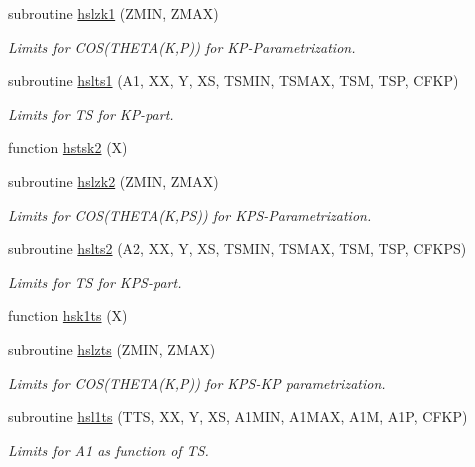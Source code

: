 \begin{DoxyCompactItemize}
subroutine \hyperlink{djangoh__h_8f_aa2758c7c67c101829423ac8239b00e62}{hslzk1} (Z\+M\+IN, Z\+M\+AX)
\begin{DoxyCompactList}\small\item\em Limits for C\+O\+S(\+T\+H\+E\+T\+A(\+K,\+P)) for K\+P-\/\+Parametrization. \end{DoxyCompactList}\item 
subroutine \hyperlink{djangoh__h_8f_ae4db38c1fc3b0a5dc77baf9d22e21aee}{hslts1} (A1, XX, Y, XS, T\+S\+M\+IN, T\+S\+M\+AX, T\+SM, T\+SP, C\+F\+KP)
\begin{DoxyCompactList}\small\item\em Limits for TS for K\+P-\/part. \end{DoxyCompactList}\item 
function \hyperlink{djangoh__h_8f_adc1cb09f2687cf5b9932be168cea4fb2}{hstsk2} (X)
\item 
subroutine \hyperlink{djangoh__h_8f_ac76dab3307c7242c03f4c84e184655b4}{hslzk2} (Z\+M\+IN, Z\+M\+AX)
\begin{DoxyCompactList}\small\item\em Limits for C\+O\+S(\+T\+H\+E\+T\+A(\+K,\+P\+S)) for K\+P\+S-\/\+Parametrization. \end{DoxyCompactList}\item 
subroutine \hyperlink{djangoh__h_8f_a1c48c9d9f00ce080540e6074ae6f2464}{hslts2} (A2, XX, Y, XS, T\+S\+M\+IN, T\+S\+M\+AX, T\+SM, T\+SP, C\+F\+K\+PS)
\begin{DoxyCompactList}\small\item\em Limits for TS for K\+P\+S-\/part. \end{DoxyCompactList}\item 
function \hyperlink{djangoh__h_8f_a692a9648fb9a7a3fb31ce19d43f93320}{hsk1ts} (X)
\item 
subroutine \hyperlink{djangoh__h_8f_a7b2ae9bd269d18a4870a966f53575c8f}{hslzts} (Z\+M\+IN, Z\+M\+AX)
\begin{DoxyCompactList}\small\item\em Limits for C\+O\+S(\+T\+H\+E\+T\+A(\+K,\+P)) for K\+P\+S-\/\+KP parametrization. \end{DoxyCompactList}\item 
subroutine \hyperlink{djangoh__h_8f_ace5a98ed477cad1bb311954ce4a0ad57}{hsl1ts} (T\+TS, XX, Y, XS, A1\+M\+IN, A1\+M\+AX, A1M, A1P, C\+F\+KP)
\begin{DoxyCompactList}\small\item\em Limits for A1 as function of TS. \end{DoxyCompactList}\item 

\end{DoxyCompactItemize}

